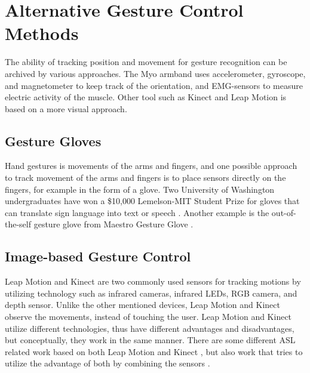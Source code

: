 \section{Alternative Gesture Control Methods}
\sloppy
The ability of tracking position and movement for gesture recognition can be archived by various approaches. The Myo armband uses accelerometer, gyroscope, and magnetometer to keep track of the orientation, and EMG-sensors to measure electric activity of the muscle. Other tool such as Kinect and Leap Motion is based on a more visual approach. 

\subsection{Gesture Gloves}
Hand gestures is movements of the arms and fingers, and one possible approach to track movement of the arms and fingers is to place sensors directly on the fingers, for example in the form of a glove. Two University of Washington undergraduates have won a \$10,000 Lemelson-MIT Student Prize for gloves that can translate sign language into text or speech \cite{uw:SignAloud}. Another example is the out-of-the-self gesture glove from Maestro Gesture Glove \cite{maestroglove}.

\subsection{Image-based Gesture Control}
Leap Motion \cite{leap_motion} and Kinect \cite{kinect} are two commonly used sensors for tracking motions by utilizing technology such as infrared cameras, infrared LEDs, RGB camera, and depth sensor. Unlike the other mentioned devices, Leap Motion and Kinect observe the movements, instead of touching the user. Leap Motion and Kinect utilize different technologies, thus have different advantages and disadvantages, but conceptually, they work in the same manner. There are some different ASL related work based on both Leap Motion \cite{potter2013leap,chuan2014american} and Kinect \cite{zafrulla2011american,lang2012sign,chai2013sign}, but also work that tries to utilize the advantage of both by combining the sensors \cite{marin2014hand}.